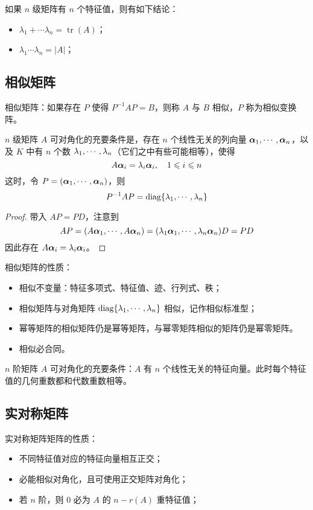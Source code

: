 如果 $n$ 级矩阵有 $n$ 个特征值，则有如下结论：
\begin{itemize}
	\item $\lambda_1 + \cdots \lambda_n = \operatorname{tr}(A)$；
	\item $\lambda_1 \cdots \lambda_n = |A|$；
\end{itemize}

\subsection{相似矩阵}

相似矩阵：如果存在 $P$ 使得 $P^{-1} A P = B$，则称 $A$ 与 $B$ 相似，$P$ 称为相似变换阵。

\begin{theorem}
	$n$ 级矩阵 $A$ 可对角化的充要条件是，存在 $n$ 个线性无关的列向量 $\boldsymbol{\alpha}_1,\cdots,\boldsymbol{\alpha}_n$，以及 $K$ 中有 $n$ 个数 $\lambda_1,\cdots,\lambda_n$（它们之中有些可能相等），使得
	\[ A\boldsymbol{\alpha}_i = \lambda_i \boldsymbol{\alpha}_i, \quad  1 \leqslant i \leqslant n \]
	这时，令 $P = (\boldsymbol{\alpha}_1,\cdots,\boldsymbol{\alpha}_n)$，则
	\[ P^{-1}AP = \operatorname{diag} \{\lambda_1,\cdots,\lambda_n\} \]
\end{theorem}

\begin{proof}
	带入 $AP = PD$，注意到
	\[ AP = (A\boldsymbol{\alpha}_1,\cdots,A\boldsymbol{\alpha}_n) = (\lambda_1 \boldsymbol{\alpha}_1, \cdots, \lambda_n \boldsymbol{\alpha}_n)D = PD \]
	因此存在 $A \boldsymbol{\alpha}_i = \lambda_i \boldsymbol{\alpha}_i$。
\end{proof}

相似矩阵的性质：
\begin{itemize}
	\item 相似不变量：特征多项式、特征值、迹、行列式、秩；
	\item 相似矩阵与对角矩阵 $\operatorname{diag}\{\lambda_1,\cdots,\lambda_n\}$ 相似，记作相似标准型；
	\item 幂等矩阵的相似矩阵仍是幂等矩阵，与幂零矩阵相似的矩阵仍是幂零矩阵。
	\item 相似必合同。
\end{itemize}

$n$ 阶矩阵 $A$ 可对角化的充要条件：$A$ 有 $n$ 个线性无关的特征向量。此时每个特征值的几何重数都和代数重数相等。

\subsection{实对称矩阵}

实对称矩阵矩阵的性质：
\begin{itemize}
	\item 不同特征值对应的特征向量相互正交；
	\item 必能相似对角化，且可使用正交矩阵对角化；
	\item 若 $n$ 阶，则 $0$ 必为 $A$ 的 $n-r(A)$ 重特征值；
\end{itemize}

